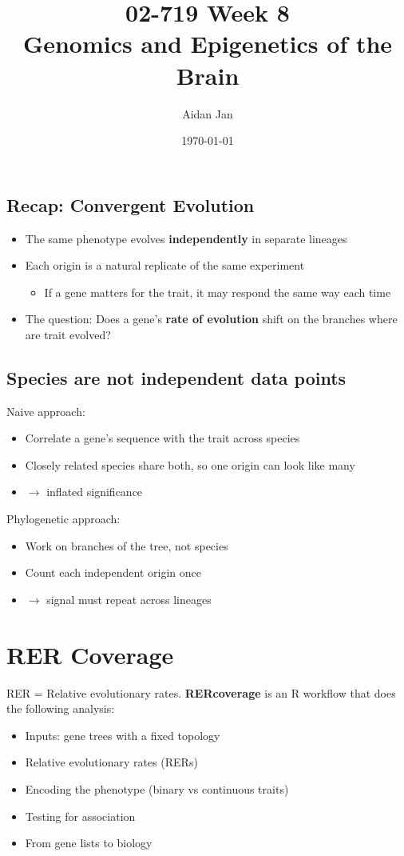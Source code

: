\documentclass[10pt]{article}
\title{02-719 Week 8 \\ \large{Genomics and Epigenetics of the Brain}}
\author{Aidan Jan}
\date{\today}
\begin{document}
\maketitle
\subsection*{Recap: Convergent Evolution}
\begin{itemize}
    \item The same phenotype evolves \textbf{independently} in separate lineages
    \item Each origin is a natural replicate of the same experiment
    \begin{itemize}
        \item If a gene matters for the trait, it may respond the same way each time
    \end{itemize}
    \item The question: Does a gene's \textbf{rate of evolution} shift on the branches where are trait evolved?
\end{itemize}

\subsection*{Species are not independent data points}
Naive approach:
\begin{itemize}
    \item Correlate a gene's sequence with the trait across species
    \item Closely related species share both, so one origin can look like many
    \item $\rightarrow$ inflated significance
\end{itemize}
Phylogenetic approach:
\begin{itemize}
    \item Work on branches of the tree, not species
    \item Count each independent origin once
    \item $\rightarrow$ signal must repeat across lineages
\end{itemize}

\section*{RER Coverage}
RER = Relative evolutionary rates.  \textbf{RERcoverage} is an R workflow that does the following analysis:
\begin{itemize}
    \item Inputs: gene trees with a fixed topology
    \item Relative evolutionary rates (RERs)
    \item Encoding the phenotype (binary vs continuous traits)
    \item Testing for association
    \item From gene lists to biology
\end{itemize}
\end{document}
